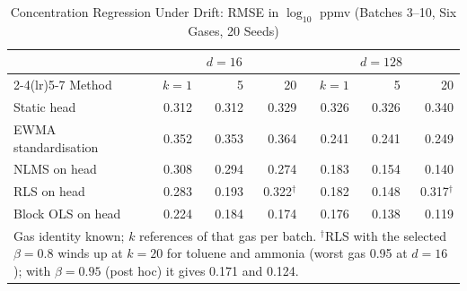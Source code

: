 \begin{table}[t]
\caption{Concentration Regression Under Drift: RMSE in $\log_{10}$ ppmv (Batches 3--10, Six Gases, 20 Seeds)}
\label{tab:e3}\centering\footnotesize\setlength{\tabcolsep}{3.5pt}
\begin{tabular}{l rrr rrr}\toprule
 & \multicolumn{3}{c}{$d=16$} & \multicolumn{3}{c}{$d=128$}\\\cmidrule(lr){2-4}\cmidrule(lr){5-7}
Method & $k=1$ & 5 & 20 & $k=1$ & 5 & 20\\\midrule
Static head & 0.312 & 0.312 & 0.329 & 0.326 & 0.326 & 0.340\\
EWMA standardisation & 0.352 & 0.353 & 0.364 & 0.241 & 0.241 & 0.249\\
NLMS on head & 0.308 & 0.294 & 0.274 & 0.183 & 0.154 & 0.140\\
RLS on head & 0.283 & 0.193 & 0.322$^\dagger$ & 0.182 & 0.148 & 0.317$^\dagger$\\
Block OLS on head & 0.224 & 0.184 & 0.174 & 0.176 & 0.138 & 0.119\\
\bottomrule
\multicolumn{7}{p{0.95\columnwidth}}{\scriptsize Gas identity known; $k$ references of that gas per batch. $^\dagger$RLS with the selected $\beta=0.8$ winds up at $k=20$ for toluene and ammonia (worst gas 0.95 at $d=16$); with $\beta=0.95$ (post hoc) it gives 0.171 and 0.124.}
\end{tabular}
\end{table}
